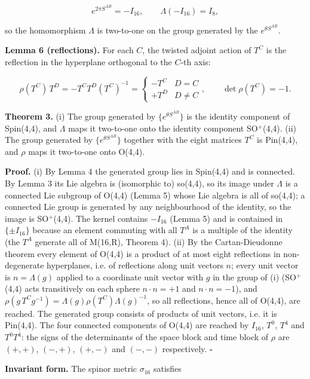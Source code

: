 \documentclass[10pt]{article}
\makeatletter
\newcommand\keepnext{\par\nopagebreak\@nobreaktrue\everypar{\@nobreakfalse\everypar{}}}
\makeatother
\begin{document}
\[
e^{2\pi S^{AB}} = -I_{16}, \qquad \Lambda(-I_{16}) = I_8 ,
\]

so the homomorphism $\Lambda$ is two-to-one on the group generated by the $e^{\theta S^{AB}}$.


\textbf{Lemma 6 (reflections).} For each $C$, the twisted adjoint action of $T^C$ is the reflection in the hyperplane orthogonal to the $C$-th axis:\keepnext


\[
\rho(T^C)\,T^D = -T^C T^D (T^C)^{-1} = \begin{cases} -T^C & D = C \\ +T^D & D\neq C \end{cases}, \qquad \det\rho(T^C) = -1 .
\]

\textbf{Theorem 3.} (i) The group generated by $\{e^{\theta S^{AB}}\}$ is the identity component of Spin(4,4), and $\Lambda$ maps it two-to-one onto the identity component SO$^+$(4,4). (ii) The group generated by $\{e^{\theta S^{AB}}\}$ together with the eight matrices $T^C$ is Pin(4,4), and $\rho$ maps it two-to-one onto O(4,4).


\textbf{Proof.} (i) By Lemma 4 the generated group lies in Spin(4,4) and is connected. By Lemma 3 its Lie algebra is (isomorphic to) so(4,4), so its image under $\Lambda$ is a connected Lie subgroup of O(4,4) (Lemma 5) whose Lie algebra is all of so(4,4); a connected Lie group is generated by any neighbourhood of the identity, so the image is SO$^+$(4,4). The kernel contains $-I_{16}$ (Lemma 5) and is contained in $\{\pm I_{16}\}$ because an element commuting with all $T^A$ is a multiple of the identity (the $T^A$ generate all of M(16,R), Theorem 4). (ii) By the Cartan-Dieudonne theorem every element of O(4,4) is a product of at most eight reflections in non-degenerate hyperplanes, i.e. of reflections along unit vectors $n$; every unit vector is $n = \Lambda(g)$ applied to a coordinate unit vector with $g$ in the group of (i) (SO$^+$(4,4) acts transitively on each sphere $n\cdot n=+1$ and $n\cdot n=-1$), and $\rho(g\,T^C g^{-1}) = \Lambda(g)\rho(T^C)\Lambda(g)^{-1}$, so all reflections, hence all of O(4,4), are reached. The generated group consists of products of unit vectors, i.e. it is Pin(4,4). The four connected components of O(4,4) are reached by $I_{16}$, $T^0$, $T^4$ and $T^0T^4$: the signs of the determinants of the space block and time block of $\rho$ are $(+,+)$, $(-,+)$, $(+,-)$ and $(-,-)$ respectively. $\square$


\textbf{Invariant form.} The spinor metric $\sigma_{16}$ satisfies\keepnext
\end{document}
